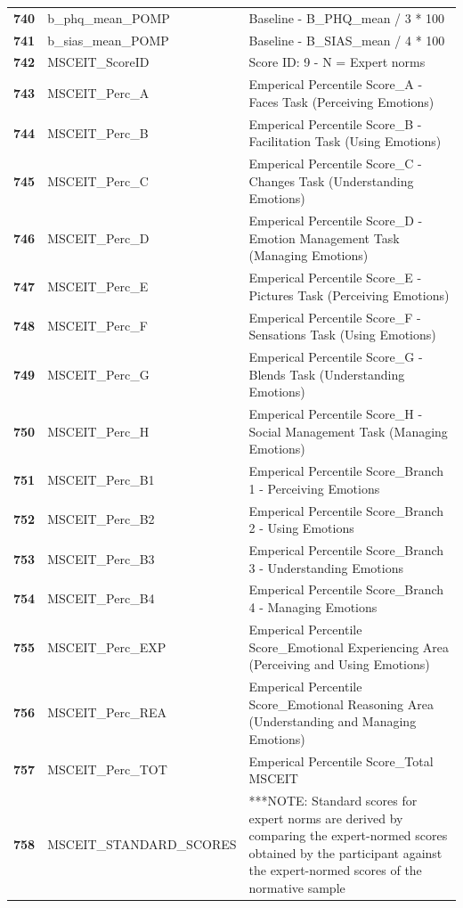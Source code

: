 \documentclass[
  letterpaper,
  DIV=11,
  numbers=noendperiod]{scrartcl}
\begin{document}
\begin{longtable}[t]{>{}cll}
\textbf{740} & b\_phq\_mean\_POMP & Baseline - B\_PHQ\_mean / 3 * 100\\
\addlinespace
\textbf{741} & b\_sias\_mean\_POMP & Baseline - B\_SIAS\_mean / 4 * 100\\
\textbf{742} & MSCEIT\_ScoreID & Score ID: 9 - N = Expert norms\\
\textbf{743} & MSCEIT\_Perc\_A & Emperical Percentile Score\_A - Faces Task (Perceiving Emotions)\\
\textbf{744} & MSCEIT\_Perc\_B & Emperical Percentile Score\_B - Facilitation Task (Using Emotions)\\
\textbf{745} & MSCEIT\_Perc\_C & Emperical Percentile Score\_C - Changes Task (Understanding Emotions)\\
\addlinespace
\textbf{746} & MSCEIT\_Perc\_D & Emperical Percentile Score\_D - Emotion Management Task (Managing Emotions)\\
\textbf{747} & MSCEIT\_Perc\_E & Emperical Percentile Score\_E - Pictures Task (Perceiving Emotions)\\
\textbf{748} & MSCEIT\_Perc\_F & Emperical Percentile Score\_F - Sensations Task (Using Emotions)\\
\textbf{749} & MSCEIT\_Perc\_G & Emperical Percentile Score\_G - Blends Task (Understanding Emotions)\\
\textbf{750} & MSCEIT\_Perc\_H & Emperical Percentile Score\_H - Social Management Task (Managing Emotions)\\
\addlinespace
\textbf{751} & MSCEIT\_Perc\_B1 & Emperical Percentile Score\_Branch 1 - Perceiving Emotions\\
\textbf{752} & MSCEIT\_Perc\_B2 & Emperical Percentile Score\_Branch 2 - Using Emotions\\
\textbf{753} & MSCEIT\_Perc\_B3 & Emperical Percentile Score\_Branch 3 - Understanding Emotions\\
\textbf{754} & MSCEIT\_Perc\_B4 & Emperical Percentile Score\_Branch 4 - Managing Emotions\\
\textbf{755} & MSCEIT\_Perc\_EXP & Emperical Percentile Score\_Emotional Experiencing Area (Perceiving and Using Emotions)\\
\addlinespace
\textbf{756} & MSCEIT\_Perc\_REA & Emperical Percentile Score\_Emotional Reasoning Area (Understanding and Managing Emotions)\\
\textbf{757} & MSCEIT\_Perc\_TOT & Emperical Percentile Score\_Total MSCEIT\\
\textbf{758} & MSCEIT\_STANDARD\_SCORES & ***NOTE: Standard scores for expert norms are derived by comparing the expert-normed scores obtained by the participant against the expert-normed scores of the normative sample\\

\end{longtable}
\end{document}
